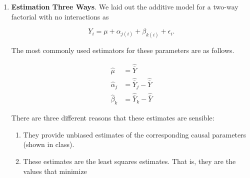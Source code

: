 \documentclass[
  letterpaper,
  DIV=11,
  numbers=noendperiod]{scrartcl}
\begin{document}
\begin{enumerate}
  \begin{enumerate}
  \def\labelenumii{\alph{enumii}.}
  \item
    Create a \emph{main effects plot} for each of the three factors ---
    light intensity, watering frequency, and soil type --- and interpret
    each one. Which factor appears to have the largest main effect on
    shoot dry weight?
  \item
    Construct \emph{three two-way interaction plots} (one for each pair
    of factors: light × water, light × soil, water × soil) and interpret
    them. Do any of the pairs show evidence of an interaction?
  \item
    Construct a \emph{three-way interaction plot} by plotting mean shoot
    dry weight against one factor on the x-axis, a second factor mapped
    to color and line type, and using \texttt{facet\_wrap()} on the
    third. Interpret what you see: is there evidence that a two-way
    interaction changes in character across levels of the third factor?
  \item
    Fit a full three-way ANOVA model using
    \texttt{aov(weight\ \textasciitilde{}\ light\ *\ water\ *\ soil,\ data\ =\ plants)}.
    Report the ANOVA table and, for each term in the model, state
    whether you would conclude the effect is present.
  \end{enumerate}
\item
  \textbf{Estimation Three Ways}. We laid out the additive model for a
  two-way factorial with no interactions as

  \[
  Y_{i} = \mu + \alpha_{j(i)} + \beta_{k(i)} + \epsilon_{i}.
  \]

  The most commonly used estimators for these parameters are as follows.

  \[
  \begin{aligned}
  \hat{\mu} &= \hat{\bar{Y}} \\
  \hat{\alpha}_j &= \hat{\bar{Y}}_j - \hat{\bar{Y}} \\
  \hat{\beta}_k &= \hat{\bar{Y}}_k - \hat{\bar{Y}}
  \end{aligned}
  \]

  There are three different reasons that these estimates are sensible:

  \begin{enumerate}
  \def\labelenumii{\alph{enumii}.}
  \item
    They provide unbiased estimates of the corresponding causal
    parameters (shown in class).
  \item
    These estimates are the least squares estimates. That is, they are
    the values that minimize
  \end{enumerate}


\end{enumerate}
\end{document}
